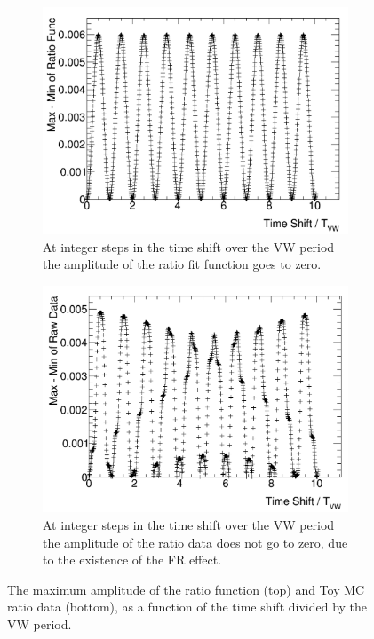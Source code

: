 \documentclass[12pt,letterpaper]{article}
\begin{document}
\begin{figure}[]
\centering
    \begin{subfigure}[t]{0.7\textwidth}
        \centering
        \includegraphics[width=\textwidth]{JamesAnalytic_RatioAmp_noFR}
        \caption{At integer steps in the time shift over the VW period the amplitude of the ratio fit function goes to zero.}
    \label{fig:ratiofunc_analytic}
    \end{subfigure}%
    \vspace{5mm}
    \begin{subfigure}[t]{0.7\textwidth}
        \centering
        \includegraphics[width=\textwidth]{JamesAnalytic_RatioAmp_withFR}
        \caption{At integer steps in the time shift over the VW period the amplitude of the ratio data does not go to zero, due to the existence of the FR effect.}
    \label{fig:ratiofunc_data}
    \end{subfigure}
\caption[]{The maximum amplitude of the ratio function (top) and Toy MC ratio data (bottom), as a function of the time shift divided by the VW period.}
\label{fig:ratiofunc_compare}
\end{figure}
\end{document}
